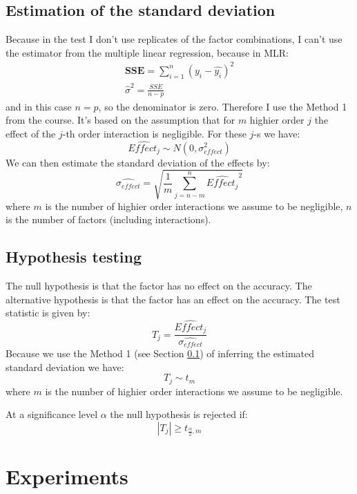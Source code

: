 \documentclass{article}
\begin{document}
\subsection{Estimation of the standard deviation}
\label{subsec:std_estim}

Because in the test I don't use replicates of the factor combinations, I can't use the estimator from the multiple linear regression, because in MLR:
\begin{align}
    \mathbf{SSE} = \sum_{i=1}^{n} \left(y_i - \hat{y_i} \right)^2 \\
    \hat{\sigma}^2 = \frac{SSE}{n-p}
\end{align}
and in this case $n=p$, so the denominator is zero. Therefore I use the Method 1 from the course. It's based on the assumption that for $m$ highier order $j$ the effect of the $j$-th order interaction is negligible. For these $j$-s we have:
\begin{equation}
    \widehat{Effect_j} \sim N(0, \sigma_{effect}^2)
\end{equation}
We can then estimate the standard deviation of the effects by:
\begin{equation}
    \widehat{\sigma_{effect}} = \sqrt{\frac{1}{m} \sum_{j=n-m}^{n} \widehat{Effect_j}^2}
\end{equation}
where $m$ is the number of highier order interactions we assume to be negligible, $n$ is the number of factors (including interactions).

\subsection{Hypothesis testing}

The null hypothesis is that the factor has no effect on the accuracy. The alternative hypothesis is that the factor has an effect on the accuracy. The test statistic is given by:
\begin{equation}
    T_j = \frac{\widehat{Effect_j}}{\widehat{\sigma_{effect}}}
\end{equation}
Because we use the Method 1 (see Section \ref{subsec:std_estim}) of inferring the estimated standard deviation we have:
\begin{equation}
    T_j \sim t_{m}
\end{equation}
where $m$ is the number of highier order interactions we assume to be negligible.

At a significance level $\alpha$ the null hypothesis is rejected if:
\begin{equation}
    |T_j| \geq t_{\frac{\alpha}{2}, m}
\end{equation}

\section{Experiments}
\end{document}
